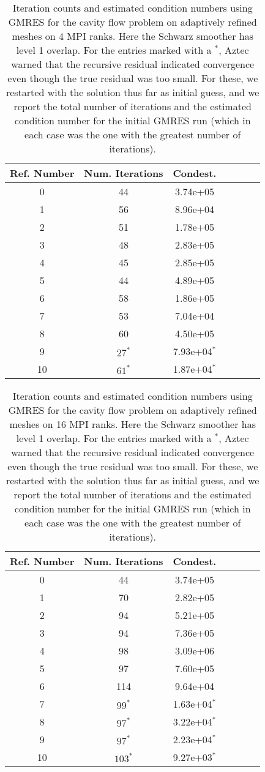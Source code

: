 \documentclass[11pt]{amsart}
\begin{document}
\begin{table}
\begin{tabular}{ c  c  c  c  c  c c}
Ref. Number	&Num. Iterations	&Condest.\\
\hline
0	&44	&3.74e+05\\
1	&56	&8.96e+04\\
2	&51	&1.78e+05\\
3	&48	&2.83e+05\\
4	&45	&2.85e+05\\
5	&44	&4.89e+05\\
6	&58	&1.86e+05\\
7	&53	&7.04e+04\\
8	&60	&4.50e+05\\
9	&$27^*$	&7.93e+04$^*$\\
10 	&$61^*$	&1.87e+04$^*$\\
\end{tabular}
\caption{Iteration counts and estimated condition numbers using GMRES for the cavity flow problem on adaptively refined meshes on 4 MPI ranks.  Here the Schwarz smoother has level 1 overlap.  For the entries marked with a $^*$, Aztec warned that the recursive residual indicated convergence even though the true residual was too small.  For these, we restarted with the solution thus far as initial guess, and we report the total number of iterations and the estimated condition number for the initial GMRES run (which in each case was the one with the greatest number of iterations).}
\label{table:stokesConditioningStudyAdaptiveMeshes4RanksGMRES}
\end{table}

\begin{table}
\begin{tabular}{ c  c  c  c  c  c c}
Ref. Number	&Num. Iterations	&Condest.\\
\hline
0	&44	&3.74e+05\\
1	&70	&2.82e+05\\
2	&94	&5.21e+05\\
3	&94	&7.36e+05\\
4	&98	&3.09e+06\\
5	&97	&7.60e+05\\
6	&114	&9.64e+04\\
7	&$99^*$	&1.63e+04$^*$\\
8	&$97^*$	&3.22e+04$^*$\\
9	&$97^*$	&2.23e+04$^*$\\
10 	&$103^*$	&9.27e+03$^*$\\
\end{tabular}
\caption{Iteration counts and estimated condition numbers using GMRES for the cavity flow problem on adaptively refined meshes on 16 MPI ranks.  Here the Schwarz smoother has level 1 overlap.  For the entries marked with a $^*$, Aztec warned that the recursive residual indicated convergence even though the true residual was too small.  For these, we restarted with the solution thus far as initial guess, and we report the total number of iterations and the estimated condition number for the initial GMRES run (which in each case was the one with the greatest number of iterations).}
\label{table:stokesConditioningStudyAdaptiveMeshes16RanksGMRES}
\end{table}
\end{document}
